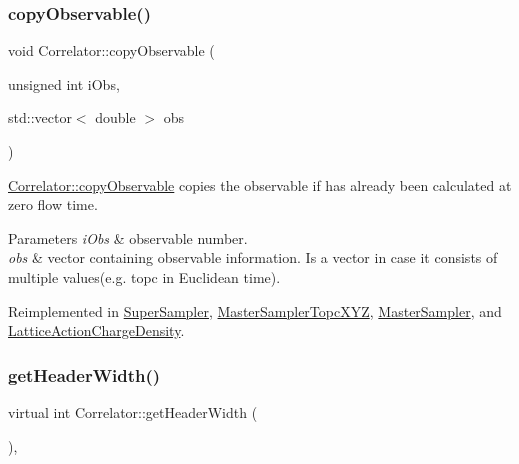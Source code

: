 \subsubsection{\texorpdfstring{copyObservable()}{copyObservable()}}
{\footnotesize\ttfamily void Correlator\+::copy\+Observable (\begin{DoxyParamCaption}\item[{unsigned int}]{i\+Obs,  }\item[{std\+::vector$<$ double $>$}]{obs }\end{DoxyParamCaption})\hspace{0.3cm}{\ttfamily [virtual]}}



\mbox{\hyperlink{class_correlator_ac780d8b180294ee4801ede6e6a13f7f4}{Correlator\+::copy\+Observable}} copies the observable if has already been calculated at zero flow time. 


\begin{DoxyParams}{Parameters}
{\em i\+Obs} & observable number. \\
\hline
{\em obs} & vector containing observable information. Is a vector in case it consists of multiple values(e.\+g. topc in Euclidean time). \\
\hline
\end{DoxyParams}


Reimplemented in \mbox{\hyperlink{class_super_sampler_a9f9155a519b2f60f029e92f641f54c9c}{Super\+Sampler}}, \mbox{\hyperlink{class_master_sampler_topc_x_y_z_a49ef8ccce4bf9473017bbb7c01f1404b}{Master\+Sampler\+Topc\+X\+YZ}}, \mbox{\hyperlink{class_master_sampler_a893be9ba7dca98cb8d9d3cb30e42fcc3}{Master\+Sampler}}, and \mbox{\hyperlink{class_lattice_action_charge_density_aef63c9fba819e838a87b509d53be248b}{Lattice\+Action\+Charge\+Density}}.

\mbox{\label{class_correlator_a76375274cb578f48b9d51489ca8cd503}} 
\subsubsection{\texorpdfstring{getHeaderWidth()}{getHeaderWidth()}}
{\footnotesize\ttfamily virtual int Correlator\+::get\+Header\+Width (\begin{DoxyParamCaption}{ }\end{DoxyParamCaption})\hspace{0.3cm}{\ttfamily [inline]}, {\ttfamily [virtual]}}

